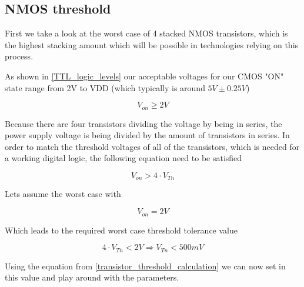 \subsection{NMOS threshold}\label{nmos_gate_dimensioning}
First we take a look at the worst case of 4 stacked NMOS transistors, which is the highest stacking amount which will be possible in technologies relying on this process.


As shown in  \autoref{TTL_logic_levels} our acceptable voltages for our CMOS "ON" state range from 2V to VDD (which typically is around $5V\pm0.25V$)

\begin{equation}
V_{on} \geq 2V
\end{equation}

Because there are four transistors dividing the voltage by being in series, the power supply voltage is being divided by the amount of transistors in series.
In order to match the threshold voltages of all of the transistors, which is needed for a working digital logic, the following equation need to be satisfied

\begin{equation}
V_{on} > 4 \cdot V_{Tn}
\end{equation}

Lets assume the worst case with

\begin{equation}
V_{on} = 2V
\end{equation}

Which leads to the required worst case threshold tolerance value

\begin{equation}
4 \cdot V_{Tn} < 2V
\Rightarrow
V_{Tn} < 500mV
\end{equation}
 
Using the equation from \autoref{transistor_threshold_calculation} we can now set in this value and play around with the parameters.
  
